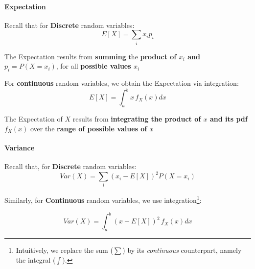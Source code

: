 \documentclass[notes=show,smaller,handout]{beamer}\usepackage[]{graphicx}\usepackage[]{color}
\renewcommand{\Pr}{P}
\begin{document}
\begin{frame}{\secname}
\framesubtitle{Expectation}
  Recall that for  \textbf{Discrete} random variables:
  \begin{equation*}
  E\left[ X\right] =\sum_{i}x_{i}p_{i}
  \end{equation*}
  \begin{center}
  The Expectation results from \textbf{summing} the \textbf{product of $x_{i}$ and $p_{i}=P(X=x_{i})$}, for all \textbf{possible values $x_{i}$}
  \end{center}

  \medskip

  \pause

  \begin{definition}
  For \textbf{continuous} random variables, we obtain the Expectation via integration:
  \begin{equation*}
  E\left[ X\right] =\int_{a}^{b}x\,f_{X}\left( x\right)dx
  \end{equation*}

  \begin{center}
   The Expectation of $X$ results from \textbf{integrating the product of $x$ and its pdf $
  f_{X}\left( x\right) $} over the \textbf{range of possible values of $x$}
  \end{center}
  \end{definition}
\end{frame}

\begin{frame}{\secname}
\framesubtitle{Variance}
  Recall that, for \textbf{Discrete} random variables:
  \begin{equation*}
  Var\left( X\right) =\sum_{i}\left( x_{i}-E\left[ X\right] \right) ^{2}\Pr
  \left( X=x_{i}\right)
  \end{equation*}

  \bigskip

  \begin{definition}
  Similarly, for \textbf{Continuous} random variables, we use integration\footnote{Intuitively, we replace the sum ($\sum$) by its \emph{continuous} counterpart, namely the integral ($\int$).}:

  \begin{equation*}
  Var\left( X\right) =\int_{a}^{b}\left( x-E\left[ X\right] \right)
  ^{2}\,f_{X}\left( x\right) dx
  \end{equation*}
  \end{definition}
\end{frame}
\end{document}
